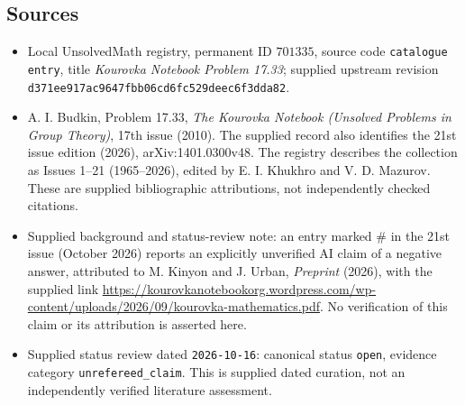 \documentclass[11pt]{article}
\begin{document}
\subsection{Sources}
\begin{itemize}
\item Local UnsolvedMath registry, permanent ID \(701335\), source code \texttt{catalogue entry}, title \emph{Kourovka Notebook Problem 17.33}; supplied upstream revision \texttt{d371ee917ac9647fbb06cd6fc529deec6f3dda82}.
\item A. I. Budkin, Problem 17.33, \emph{The Kourovka Notebook (Unsolved Problems in Group Theory)}, 17th issue (2010). The supplied record also identifies the 21st issue edition (2026), arXiv:1401.0300v48. The registry describes the collection as Issues 1--21 (1965--2026), edited by E. I. Khukhro and V. D. Mazurov. These are supplied bibliographic attributions, not independently checked citations.
\item Supplied background and status-review note: an entry marked \(\#\) in the 21st issue (October 2026) reports an explicitly unverified AI claim of a negative answer, attributed to M. Kinyon and J. Urban, \emph{Preprint} (2026), with the supplied link \url{https://kourovkanotebookorg.wordpress.com/wp-content/uploads/2026/09/kourovka-mathematics.pdf}. No verification of this claim or its attribution is asserted here.
\item Supplied status review dated \texttt{2026-10-16}: canonical status \texttt{open}, evidence category \texttt{unrefereed\_claim}. This is supplied dated curation, not an independently verified literature assessment.
\end{itemize}
\end{document}
